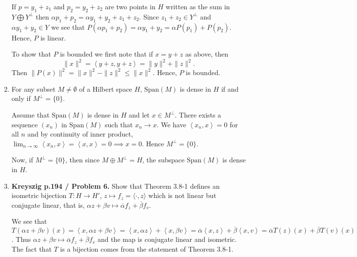 \documentclass[12pt]{article}
\newcommand{\inn}[2]{\left\langle #1, #2 \right\rangle}
\begin{document}
\begin{enumerate}
\begin{mybox}
    \vspace*{3mm} If $p=y_1+z_1$ and $p_2=y_2+z_2$ are
    two points in $H$ written as the sum in
    $Y\bigoplus Y^\perp$ then
    $\alpha p_1+p_2=\alpha y_1+y_2+z_1+z_2$. Since $z_1
    +z_2\in Y^\perp$ and $\alpha y_1+y_2\in Y$ we see that
    $P(\alpha p_1+p_2)=\alpha y_1+y_2=\alpha P(p_1)+
    P(p_2)$. Hence, $P$ is linear.

    \vspace*{3mm} To show that $P$ is bounded we first
    note that if $x=y+z$ as above, then
    $$\|x\|^2=\inn{y+z}{y+z}=\|y\|^2+\|z\|^2.$$
    Then $\|P(x)\|^2=\|x\|^2-\|z\|^2\leq\|x\|^2$. Hence,
    $P$ is bounded.
\end{mybox}

\item For any subset $M \neq \emptyset$ of a Hilbert
space $H$, $\text{Span}(M)$ is dense in $H$
if and only if
$M^{\perp} = \{0\}$.
\begin{mybox}

    Assume that $\text{Span}(M)$ is dense in $H$ and let
    $x\in M^\perp$. There exists a sequence $(x_n)$ in
    $\text{Span}(M)$ such that $x_n\longrightarrow x$.
    We have $\inn{x_n}{x}=0$ for all $n$ and by continuity
    of inner product, $\lim_{n\to\infty}{\inn{x_n}{x}}
    =\inn{x}{x}=0\implies x=0.$ Hence $M^\perp=\{0\}$.

    \vspace*{3mm}
    Now, if $M^\perp=\{0\}$, then since $M\oplus M^\perp=
    H$, the subspace $\text{Span}(M)$ is dense in $H$.
\end{mybox}

\item \textbf{Kreyszig p.194 / Problem 6.}
Show that Theorem 3.8-1 defines an isometric
bijection $T: H\to H'$, $z \mapsto f_z = \langle\cdot, z
\rangle$ which is not linear but conjugate linear,
that is, $\alpha z +\beta v \mapsto \overline{\alpha}f_z
+\overline{\beta }f_v.$
\begin{mybox}

    We see that $T(\alpha z +\beta v)(x)=
    \inn{x}{\alpha z +\beta v}=\inn{x}{\alpha z}
    +\inn{x}{\beta v}=\overline{\alpha}\inn{x}{z}
    +\overline{\beta }\inn{x}{v}
    =\overline{\alpha}T(z)(x)
    +\overline{\beta }T(v)(x)$. Thus
    $\alpha z +\beta v \mapsto \overline{\alpha}f_z
    +\overline{\beta }f_v$ and the map is conjugate
    linear and isometric. The fact that $T$ is a bijection
    comes from the statement of Theorem 3.8-1.
\end{mybox}


\end{enumerate}
\end{document}
